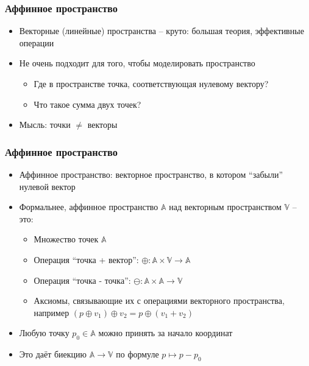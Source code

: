 \documentclass[10pt]{beamer}
\begin{document}
\begin{frame}[fragile]
\frametitle{Аффинное пространство}
\begin{itemize}
\item Векторные (линейные) пространства -- круто: большая теория, эффективные операции
\pause
\item Не очень подходит для того, чтобы моделировать пространство
\pause
\begin{itemize}
\item Где в пространстве точка, соответствующая нулевому вектору?
\pause
\item Что такое сумма двух точек?
\end{itemize}
\pause
\item Мысль: точки \begin{math}\neq\end{math} векторы
\end{itemize}
\end{frame}

\begin{frame}[fragile]
\frametitle{Аффинное пространство}
\begin{itemize}
\item Аффинное пространство: векторное пространство, в котором ``забыли''  нулевой вектор
\pause
\item Формальнее, аффинное пространство \begin{math}\mathbb A\end{math} над векторным пространством \begin{math}\mathbb V\end{math} -- это:
\pause
\begin{itemize}
\item Множество точек \begin{math}\mathbb A\end{math}
\pause
\item Операция ``точка + вектор'': \begin{math}\oplus: \mathbb A \times \mathbb V \rightarrow \mathbb A\end{math}
\pause
\item Операция ``точка - точка'': \begin{math}\ominus: \mathbb A \times \mathbb A \rightarrow \mathbb V\end{math}
\pause
\item Аксиомы, связывающие их с операциями векторного пространства, например
\begin{math}(p\oplus v_1)\oplus v_2 = p\oplus(v_1+v_2)\end{math}
\end{itemize}
\pause
\item Любую точку \begin{math}p_0\in \mathbb A\end{math} можно принять за начало координат
\item Это даёт биекцию \begin{math}\mathbb A \rightarrow \mathbb V\end{math} по формуле \begin{math}p \mapsto p - p_0\end{math}
\end{itemize}
\end{frame}
\end{document}
